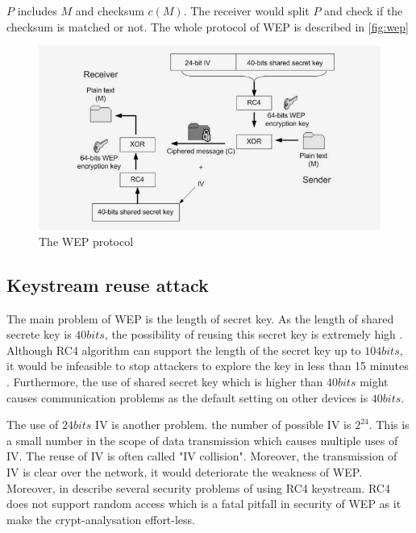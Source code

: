 	
$P$ includes $M$ and checksum $c(M)$. The receiver would split $P$ and check if the checksum is matched or not. The whole protocol of \ac{WEP} is described in \autoref{fig:wep}
\begin{figure}
	\includegraphics[scale=0.35]{images/wep.png}
	\caption{The WEP protocol \cite{al2006ieee}}
	\label{fig:wep}
\end{figure}

\subsection{Keystream reuse attack}

The main problem of \ac{WEP} is the length of secret key. As the length of shared secrete key is $40bits$, the possibility of reusing this secret key is extremely high \cite{al2006ieee}. Although \ac{RC4} algorithm can support the length of the secret key up to $104bits$, it would be infeasible to stop attackers to explore the key in less than 15 minutes \cite{convery2003cisco}. Furthermore, the use of shared secret key which is higher than $40bits$ might causes communication problems as the default setting on other devices is $40bits$. 

The use of $24bits$ \ac{IV} is another problem. the number of possible \ac{IV} is $2^{24}$. This is a small number in the scope of data transmission which causes multiple uses of \ac{IV}. The reuse of \ac{IV} is often called "\ac{IV} collision". Moreover, the transmission of \ac{IV} is clear over the network, it would deteriorate the weakness of \ac{WEP}. Moreover, \citeauthor{shunman2003wlan} in \cite{shunman2003wlan} describe several security problems of using \ac{RC4} keystream. \ac{RC4} does not support random access which is a fatal pitfall in security of \ac{WEP} as it make the crypt-analysation effort-less.

